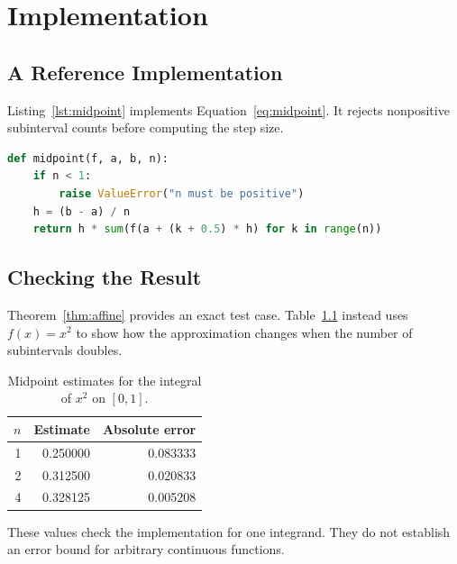 \chapter{Implementation}
\label{ch:implementation}

\section{A Reference Implementation}
Listing~\ref{lst:midpoint} implements Equation~\eqref{eq:midpoint}.
It rejects nonpositive subinterval counts before computing the step size.

\begin{lstlisting}[language=Python,caption={Composite midpoint rule.},label={lst:midpoint}]
def midpoint(f, a, b, n):
    if n < 1:
        raise ValueError("n must be positive")
    h = (b - a) / n
    return h * sum(f(a + (k + 0.5) * h) for k in range(n))
\end{lstlisting}

\section{Checking the Result}
Theorem~\ref{thm:affine} provides an exact test case.
Table~\ref{tab:convergence} instead uses \(f(x)=x^2\) to show how the
approximation changes when the number of subintervals doubles.

\begin{table}[htbp]
  \centering
  \begin{threeparttable}
  \caption{Midpoint estimates for the integral of \(x^2\) on \([0,1]\).}
  \label{tab:convergence}
  \begin{tabular}{rrr}
    \toprule
    \(n\) & Estimate & Absolute error \\
    \midrule
    1 & 0.250000 & 0.083333 \\
    2 & 0.312500 & 0.020833 \\
    4 & 0.328125 & 0.005208 \\
    \bottomrule
  \end{tabular}
  \end{threeparttable}
\end{table}

\begin{remark}
These values check the implementation for one integrand. They do not
establish an error bound for arbitrary continuous functions.
\end{remark}
